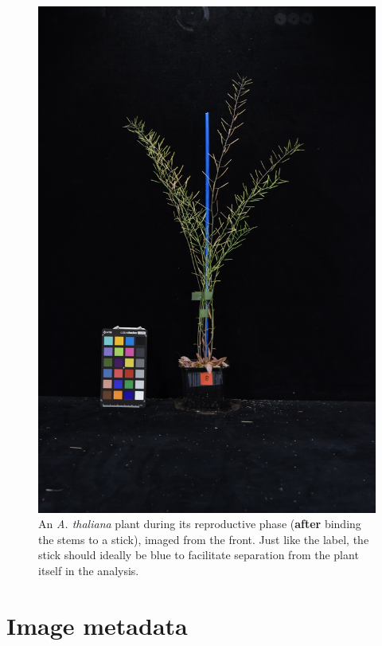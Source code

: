 \documentclass[10pt]{article}
\begin{document}
\begin{figure}[!h]
	\centering
	\includegraphics[height=0.3\textheight]{20201029_8}
	\caption[Example image of a front-view image.]{An \textit{A. thaliana} plant during its reproductive phase (\textbf{after} binding the stems to a stick), imaged from the front. Just like the label, the stick should ideally be blue to facilitate separation from the plant itself in the analysis.}
	\label{fig:front_after}
\end{figure}

\section{Image metadata\label{prep}}
\end{document}
